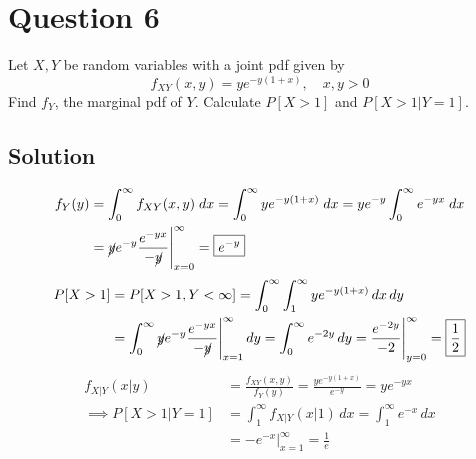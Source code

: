 \section*{Question 6}

Let \( X, Y \) be random variables with a joint pdf given by
\[
    f_{XY}(x,y)=ye^{-y(1+x)}, \quad x,y>0
\]
Find \(f_Y\), the marginal pdf of \(Y\).
Calculate \(P [X > 1]\) and \(P[X > 1|Y = 1]\).

\subsection*{Solution}

\begin{align*}
    f_Y(y)
     & =
    \int_{0}^{\infty} f_{XY}(x, y) \; dx
    =
    \int_{0}^{\infty} ye^{-y(1+x)} \; dx
    =
    y e^{-y} \int_{0}^{\infty} e^{-yx} \; dx
    \\ & =
    \cancel{y} e^{-y} \frac{e^{-yx}}{-\cancel{y}} \Bigg|_{x=0}^{\infty}
    =
    \boxed{
        e^{-y}
    }
\end{align*}
\begin{align*}
    P[X > 1]
     & =
    P[X > 1, Y < \infty]
    =
    \int_{0}^{\infty}
    \int_{1}^{\infty}
    ye^{-y(1+x)} \, dx \, dy
    \\ & =
    \int_{0}^{\infty}
    \cancel{y} e^{-y} \frac{e^{-yx}}{-\cancel{y}} \Bigg|_{x=1}^{\infty} \, dy
    =
    \int_{0}^{\infty}
    e^{-2y} \, dy
    =
    \frac{e^{-2y}}{-2} \Bigg|_{y=0}^{\infty}
    =
    \boxed{
        \frac{1}{2}
    }
\end{align*}
\begin{align*}
    f_{X|Y}(x|y)
     & =
    \frac{f_{XY}(x,y)}{f_{Y}(y)}
    =
    \frac{ye^{-y(1+x)}}{e^{-y}}
    =
    ye^{-yx}
    \\
    \implies
    P[X > 1 | Y = 1]
     & =
    \int_{1}^{\infty} f_{X|Y}(x|1) \, dx
    =
    \int_{1}^{\infty} e^{-x} \, dx
    \\ & =
    -e^{-x}\Big|_{x=1}^{\infty}
    =
    \boxed{
        \frac{1}{e}
    }
\end{align*}

